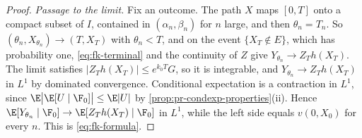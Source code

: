 \begin{proof}
\emph{Passage to the limit.} Fix an outcome. The path $X$ maps $[0,T]$ onto a compact subset of
$I$, contained in $(\alpha_n,\beta_n)$ for $n$ large, and then $\theta_n=T_n$. So
$(\theta_n,X_{\theta_n})\to(T,X_T)$ with $\theta_n<T$, and on the event $\{X_T\notin E\}$,
which has probability one, \eqref{eq:fk-terminal} and the continuity of $Z$ give
$Y_{\theta_n}\to Z_Th(X_T)$. The limit satisfies $|Z_Th(X_T)|\le e^{k_0T}G$, so it is
integrable, and $Y_{\theta_n}\to Z_Th(X_T)$ in $L^1$ by dominated convergence. Conditional
expectation is a contraction in $L^1$, since
$\E\big|\E[U\mid\F_0]\big|\le\E|U|$ by \cref{prop:pr-condexp-properties}(ii). Hence
$\E[Y_{\theta_n}\mid\F_0]\to\E[Z_Th(X_T)\mid\F_0]$ in $L^1$, while the left side equals $v(0,X_0)$
for every $n$. This is \eqref{eq:fk-formula}.
\end{proof}

